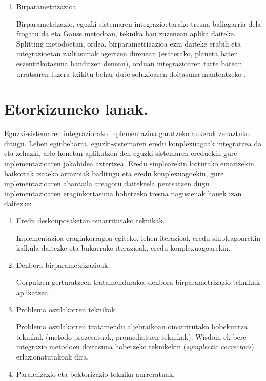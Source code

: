 \begin{enumerate}
\item Birparametrizazioa.

Birparametrizazio, eguzki-sistemaren integrazioetarako tresna baliagarria dela frogatu da \cite{Fukushima2007,Rauch1998} eta Gauss metodoan,  teknika hau zuzenean aplika daiteke. Splitting metodoetan, ordea, birparametrizazioa ezin daiteke erabili eta integrazioetan zailtasunak agertzen direnean (esaterako, planeta baten eszentrikotasuna handitzen denean), orduan integrazioaren tarte batean urratsaren luzera txikitu behar dute soluzioaren doitasuna mantentzeko \cite{Laskar2009}.

\end{enumerate}


\section*{Etorkizuneko lanak.}


Eguzki-sistemaren integraziorako inplementazioa garatzeko aukerak zehaztuko ditugu. Lehen eginbeharra, eguzki-sistemaren eredu konplexuagoak integratzea da eta zehazki, arlo honetan  aplikatzen den eguzki-sistemaren ereduekin \cite{Laskar2011} gure inplementazioaren jokabidea aztertzea. Eredu sinplearekin lortutako emaitzekin baikorrak izateko arrazoiak baditugu eta eredu konplexuagoekin, gure inplementazioaren abantaila areagotu daitekeela pentsatzen dugu. inplementazioaren eraginkortasuna hobetzeko tresna nagusienak hauek izan daitezke:


\begin{enumerate}
\item Eredu deskonposaketan oinarritutako teknikak.

Inplementazioa eraginkorragoa egiteko, lehen iterazioak eredu sinpleagoarekin kalkula daitezke eta bukaerako iterazioak, eredu konplexuagoarekin.

\item Denbora birparametrizazioak.

Gorputzen gerturatzeen tratamendurako, denbora birparametrizazio teknikak aplikatzea. 

\item Problema oszilakorren teknikak.

Problema oszilakorren tratamendu aljebraikoan oinarritutako hobekuntza teknikak (metodo prozesatuak, promediatuen teknikak).
Wisdom-ek \cite{Wisdom2006} bere integrazio metodoen doitasuna hobetzeko teknikekin (\emph{symplectic correctors}) erlazionatutakoak dira.

\item Paralelizazio eta bektorizazio teknika aurreratuak.



\end{enumerate} 









